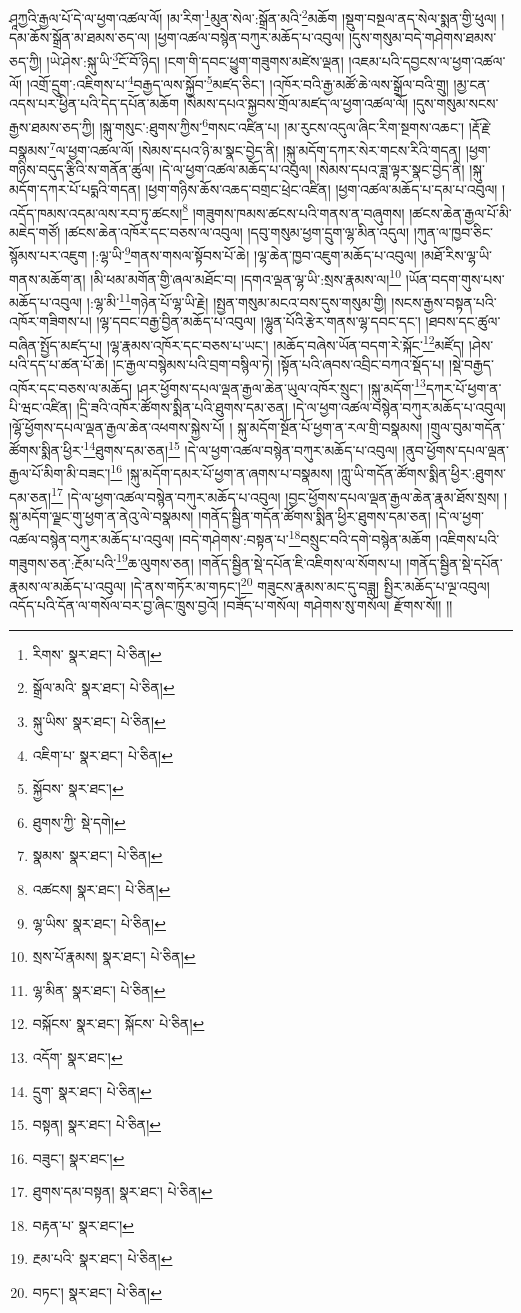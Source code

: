 ཤཱཀྱའི་རྒྱལ་པོ་དེ་ལ་ཕྱག་འཚལ་ལོ། །མ་རིག་\footnote{རིགས་  སྣར་ཐང་།  པེ་ཅིན། }མུན་སེལ་:སྒྲོན་མའི་\footnote{སྒྲོལ་མའི་  སྣར་ཐང་།  པེ་ཅིན། }མཆོག །སྡུག་བསྔལ་ནད་སེལ་སྨན་གྱི་ཕུལ། །དམ་ཆོས་སྒྲོན་མ་ཐམས་ཅད་ལ། །ཕྱག་འཚལ་བསྙེན་བཀུར་མཆོད་པ་འབུལ། །དུས་གསུམ་བདེ་གཤེགས་ཐམས་ཅད་ཀྱི། །ཡེ་ཤེས་:སྐུ་ཡི་\footnote{སྐུ་ཡིས་  སྣར་ཐང་།  པེ་ཅིན། }ངོ་བོ་ཉིད། །ངག་གི་དབང་ཕྱུག་གཟུགས་མཛེས་ལྡན། །འཇམ་པའི་དབྱངས་ལ་ཕྱག་འཚལ་ལོ། །འགྲོ་དྲུག་:འཇིགས་པ་\footnote{འཇིག་པ་  སྣར་ཐང་།  པེ་ཅིན། }བརྒྱད་ལས་སྐྱོབ་\footnote{སྐྱོབས་  སྣར་ཐང་། }མཛད་ཅིང་། །འཁོར་བའི་རྒྱ་མཚོ་ཆེ་ལས་སྒྲོལ་བའི་གྲུ། །མྱ་ངན་འདས་པར་ཕྱིན་པའི་དེད་དཔོན་མཆོག །སེམས་དཔའ་སྐྱབས་གྲོལ་མཛད་ལ་ཕྱག་འཚལ་ལོ། །དུས་གསུམ་སངས་རྒྱས་ཐམས་ཅད་ཀྱི། །སྐུ་གསུང་:ཐུགས་ཀྱིས་\footnote{ཐུགས་ཀྱི་  སྡེ་དགེ། }གསང་འཛིན་པ། །མ་རུངས་འདུལ་ཞིང་རིག་སྔགས་འཆང་། །རྡོ་རྗེ་བསྣམས་\footnote{སྣམས་  སྣར་ཐང་།  པེ་ཅིན། }ལ་ཕྱག་འཚལ་ལོ། །སེམས་དཔའ་ཉི་མ་སྣང་བྱེད་ནི། །སྐུ་མདོག་དཀར་སེར་གངས་རིའི་གདན། །ཕྱག་གཉིས་བདུད་རྩིའི་ས་གནོན་ཚུལ། །དེ་ལ་ཕྱག་འཚལ་མཆོད་པ་འབུལ། །སེམས་དཔའ་ཟླ་ལྟར་སྣང་བྱེད་ནི། །སྐུ་མདོག་དཀར་པོ་པདྨའི་གདན། །ཕྱག་གཉིས་ཆོས་འཆད་བགྲང་ཕྲེང་འཛིན། །ཕྱག་འཚལ་མཆོད་པ་དམ་པ་འབུལ། །འདོད་ཁམས་འདམ་ལས་རབ་ཏུ་ཚངས།\footnote{འཚངས།  སྣར་ཐང་།  པེ་ཅིན། } །གཟུགས་ཁམས་ཚངས་པའི་གནས་ན་བཞུགས། །ཚངས་ཆེན་རྒྱལ་པོ་མི་མཇེད་གཙོ། །ཚངས་ཆེན་འཁོར་དང་བཅས་ལ་འབུལ། །དབུ་གསུམ་ཕྱག་དྲུག་ལྷ་མིན་འདུལ། །ཀུན་ལ་ཁྱབ་ཅིང་སྙོམས་པར་འཇུག །:ལྷ་ཡི་\footnote{ལྷ་ཡིས་  སྣར་ཐང་།  པེ་ཅིན། }གནས་གསལ་སྟོབས་པོ་ཆེ། །ལྷ་ཆེན་ཁྱབ་འཇུག་མཆོད་པ་འབུལ། །མཐོ་རིས་ལྷ་ཡི་གནས་མཆོག་ན། །མི་ཕམ་མགོན་གྱི་ཞལ་མཐོང་བ། །དགའ་ལྡན་ལྷ་ཡི་:སྲས་རྣམས་ལ།\footnote{སྲས་པོ་རྣམས།  སྣར་ཐང་།  པེ་ཅིན། } །ཡོན་བདག་གུས་པས་མཆོད་པ་འབུལ། །:ལྷ་མི་\footnote{ལྷ་མིན་  སྣར་ཐང་།  པེ་ཅིན། }གཉེན་པོ་ལྷ་ཡི་རྗེ། །སྤྱན་གསུམ་མངའ་བས་དུས་གསུམ་གྱི། །སངས་རྒྱས་བསྟན་པའི་འཁོར་གཟིགས་པ། །ལྷ་དབང་བརྒྱ་བྱིན་མཆོད་པ་འབུལ། །ལྷུན་པོའི་རྩེར་གནས་ལྷ་དབང་དང་། །ཐབས་དང་ཚུལ་བཞིན་སྤྱོད་མཛད་པ། །ལྷ་རྣམས་འཁོར་དང་བཅས་པ་ཡང་། །མཆོད་བཞེས་ཡོན་བདག་རེ་སྐོང་\footnote{བསྐོངས་  སྣར་ཐང་། སྐོངས་  པེ་ཅིན། }མཛོད། །ཤེས་པའི་དད་པ་ཚན་པོ་ཆེ། །ང་རྒྱལ་བསྙེམས་པའི་བྲག་བསྙིལ་ཏེ། །སྟོན་པའི་ཞབས་འབྲིང་བཀའ་སྡོད་པ། །སྡེ་བརྒྱད་འཁོར་དང་བཅས་ལ་མཆོད། །ཤར་ཕྱོགས་དཔལ་ལྡན་རྒྱལ་ཆེན་ཡུལ་འཁོར་སྲུང་། །སྐུ་མདོག་\footnote{འདོག་  སྣར་ཐང་། }དཀར་པོ་ཕྱག་ན་པི་ཝང་འཛིན། །དྲི་ཟའི་འཁོར་ཚོགས་སྨིན་པའི་ཐུགས་དམ་ཅན། །དེ་ལ་ཕྱག་འཚལ་བསྙེན་བཀུར་མཆོད་པ་འབུལ། །ལྷོ་ཕྱོགས་དཔལ་ལྡན་རྒྱལ་ཆེན་འཕགས་སྐྱེས་པོ། །
སྐུ་མདོག་སྔོན་པོ་ཕྱག་ན་རལ་གྲི་བསྣམས། །གྲུལ་བུམ་གདོན་ཚོགས་སྨིན་ཕྱིར་\footnote{དྲུག་  སྣར་ཐང་།  པེ་ཅིན། }ཐུགས་དམ་ཅན།\footnote{བསྟན།  སྣར་ཐང་།  པེ་ཅིན། } །དེ་ལ་ཕྱག་འཚལ་བསྙེན་བཀུར་མཆོད་པ་འབུལ། །ནུབ་ཕྱོགས་དཔལ་ལྡན་རྒྱལ་པོ་མིག་མི་བཟང་།\footnote{བཟུང་།  སྣར་ཐང་། } །སྐུ་མདོག་དམར་པོ་ཕྱག་ན་ཞགས་པ་བསྣམས། །ཀླུ་ཡི་གདོན་ཚོགས་སྨིན་ཕྱིར་:ཐུགས་དམ་ཅན།\footnote{ཐུགས་དམ་བསྟན།  སྣར་ཐང་།  པེ་ཅིན། } །དེ་ལ་ཕྱག་འཚལ་བསྙེན་བཀུར་མཆོད་པ་འབུལ། །བྱང་ཕྱོགས་དཔལ་ལྡན་རྒྱལ་ཆེན་རྣམ་ཐོས་སྲས། །སྐུ་མདོག་ལྗང་གུ་ཕྱག་ན་ནེའུ་ལེ་བསྣམས། །གནོད་སྦྱིན་གདོན་ཚོགས་སྨིན་ཕྱིར་ཐུགས་དམ་ཅན། །དེ་ལ་ཕྱག་འཚལ་བསྙེན་བཀུར་མཆོད་པ་འབུལ། །བདེ་གཤེགས་:བསྟན་པ་\footnote{བརྟན་པ་  སྣར་ཐང་། }བསྲུང་བའི་དགེ་བསྙེན་མཆོག །འཇིགས་པའི་གཟུགས་ཅན་:རྔོམ་པའི་\footnote{རྔམ་པའི་  སྣར་ཐང་།  པེ་ཅིན། }ཆ་ལུགས་ཅན། །གནོད་སྦྱིན་སྡེ་དཔོན་ཇི་འཇིགས་ལ་སོགས་པ། །གནོད་སྦྱིན་སྡེ་དཔོན་རྣམས་ལ་མཆོད་པ་འབུལ། །དེ་ནས་གཏོར་མ་གཏང་།\footnote{བཏང་།  སྣར་ཐང་།  པེ་ཅིན། } གཟུངས་རྣམས་མང་དུ་བཟླ། སྤྱིར་མཆོད་པ་ལྔ་འབུལ། འདོད་པའི་དོན་ལ་གསོལ་བར་བྱ་ཞིང་ཁྲུས་བྱའོ། །བཟོད་པ་གསོལ། གཤེགས་སུ་གསོལ། རྫོགས་སོ།། །།